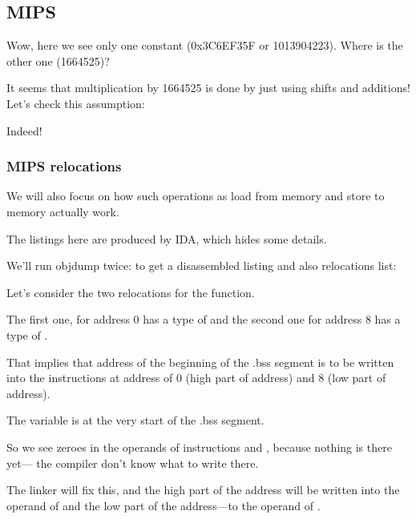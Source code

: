 \subsection{MIPS}



Wow, here we see only one constant (0x3C6EF35F or 1013904223).
Where is the other one (1664525)?

It seems that multiplication by 1664525 is done by just using shifts and additions!
Let's check this assumption:





Indeed!

\subsubsection{MIPS relocations}

We will also focus on how such operations as load from memory and store to memory actually work.

The listings here are produced by IDA, which hides some details.

We'll run objdump twice: to get a disassembled listing and also relocations list:



Let's consider the two relocations for the  function.

The first one, for address 0 has a type of 
and the second one for address 8 has a type of .

That implies that address of the beginning of the .bss segment is to be written into the instructions at
address of 0 (high part of address) and 8 (low part of address).

The  variable is at the very start of the .bss segment.

So we see zeroes in the operands of instructions \LUI and \SW, because nothing is there yet---
the compiler don't know what to write there.

The linker will fix this, and the high part of the address will be written into the operand of \LUI and
the low part of the address---to the operand of \SW.

